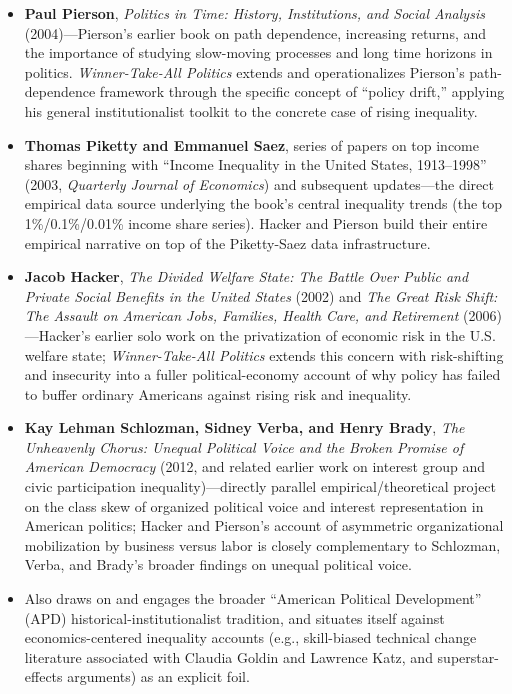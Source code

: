 \documentclass[12pt]{article}
\begin{document}
\begin{itemize}[leftmargin=*, itemsep=4pt]
    \item \textbf{Paul Pierson}, \textit{Politics in Time: History, Institutions, and Social Analysis} (2004)---Pierson's earlier book on path dependence, increasing returns, and the importance of studying slow-moving processes and long time horizons in politics. \textit{Winner-Take-All Politics} extends and operationalizes Pierson's path-dependence framework through the specific concept of ``policy drift,'' applying his general institutionalist toolkit to the concrete case of rising inequality.
    \item \textbf{Thomas Piketty and Emmanuel Saez}, series of papers on top income shares beginning with ``Income Inequality in the United States, 1913--1998'' (2003, \textit{Quarterly Journal of Economics}) and subsequent updates---the direct empirical data source underlying the book's central inequality trends (the top 1\%/0.1\%/0.01\% income share series). Hacker and Pierson build their entire empirical narrative on top of the Piketty-Saez data infrastructure.
    \item \textbf{Jacob Hacker}, \textit{The Divided Welfare State: The Battle Over Public and Private Social Benefits in the United States} (2002) and \textit{The Great Risk Shift: The Assault on American Jobs, Families, Health Care, and Retirement} (2006)---Hacker's earlier solo work on the privatization of economic risk in the U.S. welfare state; \textit{Winner-Take-All Politics} extends this concern with risk-shifting and insecurity into a fuller political-economy account of why policy has failed to buffer ordinary Americans against rising risk and inequality.
    \item \textbf{Kay Lehman Schlozman, Sidney Verba, and Henry Brady}, \textit{The Unheavenly Chorus: Unequal Political Voice and the Broken Promise of American Democracy} (2012, and related earlier work on interest group and civic participation inequality)---directly parallel empirical/theoretical project on the class skew of organized political voice and interest representation in American politics; Hacker and Pierson's account of asymmetric organizational mobilization by business versus labor is closely complementary to Schlozman, Verba, and Brady's broader findings on unequal political voice.
    \item Also draws on and engages the broader ``American Political Development'' (APD) historical-institutionalist tradition, and situates itself against economics-centered inequality accounts (e.g., skill-biased technical change literature associated with Claudia Goldin and Lawrence Katz, and superstar-effects arguments) as an explicit foil.
\end{itemize}
\end{document}
